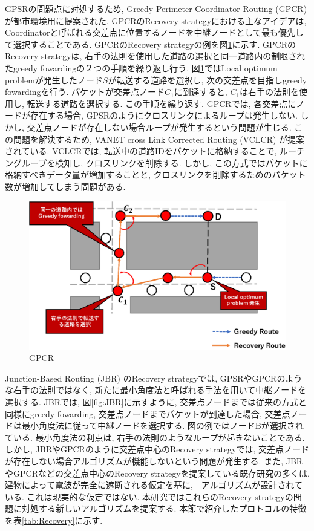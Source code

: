 \documentclass[10pt]{jreport}
\begin{document}
GPSRの問題点に対処するため, Greedy Perimeter Coordinator Routing (GPCR)\cite{7}が都市環境用に提案された. GPCRのRecovery strategyにおける主なアイデアは, Coordinatorと呼ばれる交差点に位置するノードを中継ノードとして最も優先して選択することである. GPCRのRecovery strategyの例を図\ref{fig:GPCR}に示す.
GPCRのRecovery strategyは, 右手の法則を使用した道路の選択と同一道路内の制限されたgreedy fowardingの２つの手順を繰り返し行う. 図\ref{fig:GPCR}ではLocal optimum problemが発生したノード$S$が転送する道路を選択し, 次の交差点を目指しgreedy fowardingを行う. パケットが交差点ノード$C_{1}$に到達すると, $C_{1}$は右手の法則を使用し, 転送する道路を選択する. この手順を繰り返す. GPCRでは, 各交差点にノードが存在する場合, GPSRのようにクロスリンクによるループは発生しない. しかし, 交差点ノードが存在しない場合ループが発生するという問題が生じる. この問題を解決するため, VANET cross Link Corrected Routing (VCLCR) \cite{29} が提案されている. VCLCRでは, 転送中の道路IDをパケットに格納することで, ルーチングループを検知し, クロスリンクを削除する. しかし, この方式ではパケットに格納すべきデータ量が増加することと, クロスリンクを削除するためのパケット数が増加してしまう問題がある. 

\begin{figure}[!ht]
	\centering
	\includegraphics[width=130mm]{figures/GPCR.eps}
	\caption{GPCR}
	\label{fig:GPCR}
\end{figure}

Junction-Based Routing (JBR) \cite{JBR}のRecovery strategyでは, GPSRやGPCRのような右手の法則ではなく, 新たに最小角度法と呼ばれる手法を用いて中継ノードを選択する. JBRでは, 図\ref{fig:JBR}に示すように, 交差点ノードまでは従来の方式と同様にgreedy fowarding, 交差点ノードまでパケットが到達した場合, 交差点ノードは最小角度法に従って中継ノードを選択する. 図の例ではノードBが選択されている. 最小角度法の利点は, 右手の法則のようなループが起きないことである. 
しかし, JBRやGPCRのように交差点中心のRecovery strategyでは, 交差点ノードが存在しない場合アルゴリズムが機能しないという問題が発生する. また, JBRやGPCRなどの交差点中心のRecovery strategyを提案している既存研究の多くは, 建物によって電波が完全に遮断される仮定を基に,　アルゴリズムが設計されている. これは現実的な仮定ではない. 
本研究ではこれらのRecovery strategyの問題に対処する新しいアルゴリズムを提案する. 
本節で紹介したプロトコルの特徴を表\ref{tab:Recovery}に示す.
\end{document}
